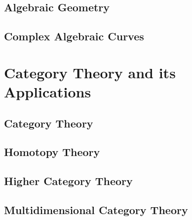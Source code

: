 \documentclass[12pt]{report}
\begin{document}
\chapter{Algebraic Geometry}\label{cha:algebraic-geometry}

\chapter{Complex Algebraic Curves}\label{cha:compl-algebr-curv}





\part{Category Theory and its Applications}\label{part:category-theory-its}

\chapter{Category Theory}\label{cha:category-theory}

\chapter{Homotopy Theory}\label{cha:homotopy-theory}

\chapter{Higher Category Theory}\label{cha:high-categ-theory}

\chapter{Multidimensional Category Theory}\label{cha:mult-categ-theory}

\printindex
\printbibliography%
\end{document}

